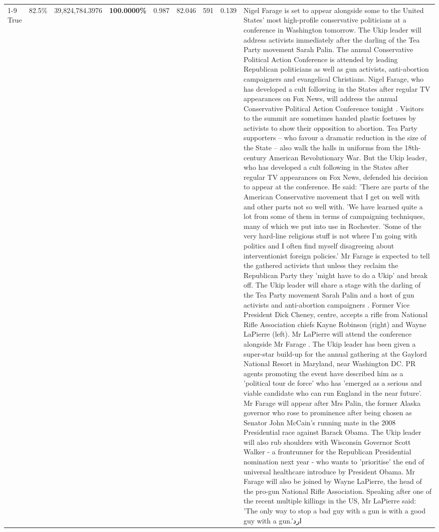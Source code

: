 \begin{table}[H]
\begin{tabular}{lllrlllll}
\cline{1-9} \cline{2-9}
True & 82.5\% & 39,824,784.3976 & \bfseries \color{red} 100.0000\% & 0.987 & 82.046 & 591 & 0.139 & Nigel Farage is set to appear alongside some to the United States' most high-profile conservative politicians at a conference in Washington tomorrow. The Ukip leader will address activists immediately after the darling of the Tea Party movement Sarah Palin. The annual Conservative Political Action Conference is attended by leading Republican politicians as well as gun activists, anti-abortion campaigners and evangelical Christians. Nigel Farage, who has developed a cult following in the States after regular TV appearances on Fox News, will address the annual Conservative Political Action Conference tonight . Visitors to the summit are sometimes handed plastic foetuses by activists to show their opposition to abortion. Tea Party supporters – who favour a dramatic reduction in the size of the State – also walk the halls in uniforms from the 18th-century American Revolutionary War. But the Ukip leader, who has developed a cult following in the States after regular TV appearances on Fox News, defended his decision to appear at the conference. He said: 'There are parts of the American Conservative movement that I get on well with and other parts not so well with. 'We have learned quite a lot from some of them in terms of campaigning techniques, many of which we put into use in Rochester. 'Some of the very hard-line religious stuff is not where I'm going with politics and I often find myself disagreeing about interventionist foreign policies.' Mr Farage is expected to tell the gathered activists that unless they reclaim the Republican Party they 'might have to do a Ukip' and break off. The Ukip leader will share a stage with the darling of the Tea Party movement Sarah Palin and a host of gun activists and anti-abortion campaigners . Former Vice President Dick Cheney, centre, accepts a rifle from National Rifle Association chiefs Kayne Robinson (right) and Wayne LaPierre (left). Mr LaPierre will attend the conference alongside Mr Farage . The Ukip leader has been given a super-star build-up for the annual gathering at the Gaylord National Resort in Maryland, near Washington DC. PR agents promoting the event have described him as a 'political tour de force' who has 'emerged as a serious and viable candidate who can run England in the near future'. Mr Farage will appear after Mrs Palin, the former Alaska governor who rose to prominence after being chosen as Senator John McCain's running mate in the 2008 Presidential race against Barack Obama. The Ukip leader will also rub shoulders with Wisconsin Governor Scott Walker - a frontrunner for the Republican Presidential nomination next year - who wants to 'prioritise' the end of universal healthcare introduce by President Obama. Mr Farage will also be joined by Wayne LaPierre, the head of the pro-gun National Rifle Association. Speaking after one of the recent multiple killings in the US, Mr LaPierre said: 'The only way to stop a bad guy with a gun is with a good guy with a gun.'ارد \\

\end{tabular}
\end{table}
